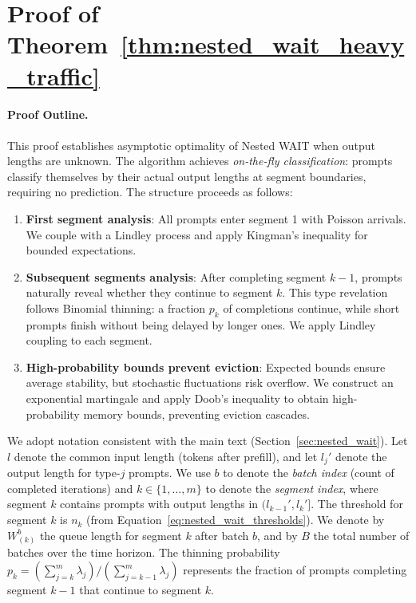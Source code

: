 
\section{Proof of Theorem~\ref{thm:nested_wait_heavy_traffic}}\label{appendix::proof of nested_wait_heavy_traffic}

\paragraph{Proof Outline.}
This proof establishes asymptotic optimality of Nested WAIT when output lengths are unknown. The algorithm achieves \emph{on-the-fly classification}: prompts classify themselves by their actual output lengths at segment boundaries, requiring no prediction. The structure proceeds as follows:
\begin{enumerate}
    \item \textbf{First segment analysis}: All prompts enter segment 1 with Poisson arrivals. We couple with a Lindley process and apply Kingman's inequality for bounded expectations.
    \item \textbf{Subsequent segments analysis}: After completing segment $k-1$, prompts naturally reveal whether they continue to segment $k$. This type revelation follows Binomial thinning: a fraction $p_k$ of completions continue, while short prompts finish without being delayed by longer ones. We apply Lindley coupling to each segment.
    \item \textbf{High-probability bounds prevent eviction}: Expected bounds ensure average stability, but stochastic fluctuations risk overflow. We construct an exponential martingale and apply Doob's inequality to obtain high-probability memory bounds, preventing eviction cascades.
\end{enumerate}

We adopt notation consistent with the main text (Section~\ref{sec:nested_wait}). Let $l$ denote the common input length (tokens after prefill), and let $l_j'$ denote the output length for type-$j$ prompts. We use $b$ to denote the \emph{batch index} (count of completed iterations) and $k \in \{1, \ldots, m\}$ to denote the \emph{segment index}, where segment $k$ contains prompts with output lengths in $(l_{k-1}', l_k']$. The threshold for segment $k$ is $n_k$ (from Equation~\eqref{eq:nested_wait_thresholds}). We denote by $W^b_{(k)}$ the queue length for segment $k$ after batch $b$, and by $B$ the total number of batches over the time horizon. The thinning probability $p_k = (\sum_{j=k}^m \lambda_j)/(\sum_{j=k-1}^m \lambda_j)$ represents the fraction of prompts completing segment $k-1$ that continue to segment $k$.


